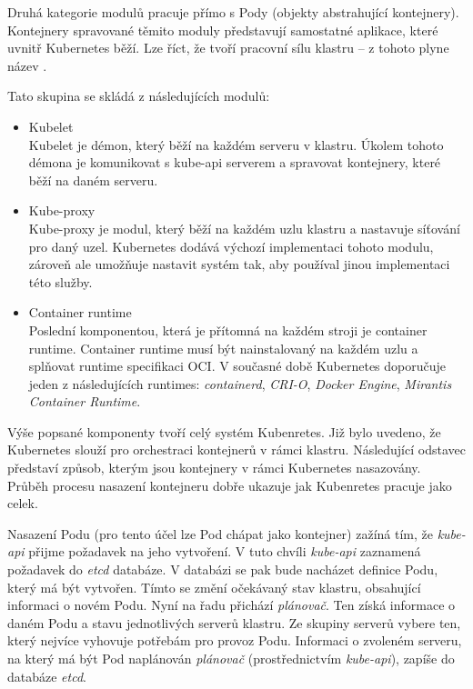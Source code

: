 Druhá kategorie modulů pracuje přímo s Pody (objekty abstrahující kontejnery). Kontejnery spravované těmito moduly představují samostatné aplikace, které uvnitř Kubernetes běží. Lze říct, že tvoří pracovní sílu klastru -- z tohoto plyne název .

Tato skupina se skládá z následujících modulů:
\begin{itemize}
    \item Kubelet\\
    Kubelet je démon, který běží na každém serveru v klastru. Úkolem tohoto démona je komunikovat s kube-api serverem a spravovat kontejnery, které běží na daném serveru. 
    \item Kube-proxy\\
    Kube-proxy je modul, který běží na každém uzlu klastru a nastavuje síťování pro daný uzel. Kubernetes dodává výchozí implementaci tohoto modulu, zároveň ale umožňuje nastavit systém tak, aby používal jinou implementaci této služby. 
    \item Container runtime\\
    Poslední komponentou, která je přítomná na každém stroji je container runtime. Container runtime musí být nainstalovaný na každém uzlu a splňovat runtime specifikaci OCI. V současné době Kubernetes doporučuje jeden z následujících runtimes: \textit{containerd}, \textit{CRI-O}, \textit{Docker Engine}, \textit{Mirantis Container Runtime}. \cite{thekubernetesauthors_2023_container} 
\end{itemize}

Výše popsané komponenty tvoří celý systém Kubenretes. \cite{nassimkebbani_2022_the} Již bylo uvedeno, že Kubernetes slouží pro orchestraci kontejnerů v rámci klastru. Následující odstavec představí způsob, kterým jsou kontejnery v rámci Kubernetes nasazovány. Průběh procesu nasazení kontejneru dobře ukazuje jak Kubenretes pracuje jako celek.

Nasazení Podu (pro tento účel lze Pod chápat jako kontejner) zažíná tím, že \textit{kube-api} přijme požadavek na jeho vytvoření. V tuto chvíli \textit{kube-api} zaznamená požadavek do \textit{etcd} databáze. V databázi se pak bude nacházet definice Podu, který má být vytvořen. Tímto se změní očekávaný stav klastru, obsahující informaci o novém Podu. Nyní na řadu přichází \textit{plánovač}. Ten získá informace o daném Podu a stavu jednotlivých serverů klastru. Ze skupiny serverů vybere ten, který nejvíce vyhovuje potřebám pro provoz Podu. Informaci o zvoleném serveru, na který má být Pod naplánován \textit{plánovač} (prostřednictvím \textit{kube-api}), zapíše do databáze \textit{etcd}.

